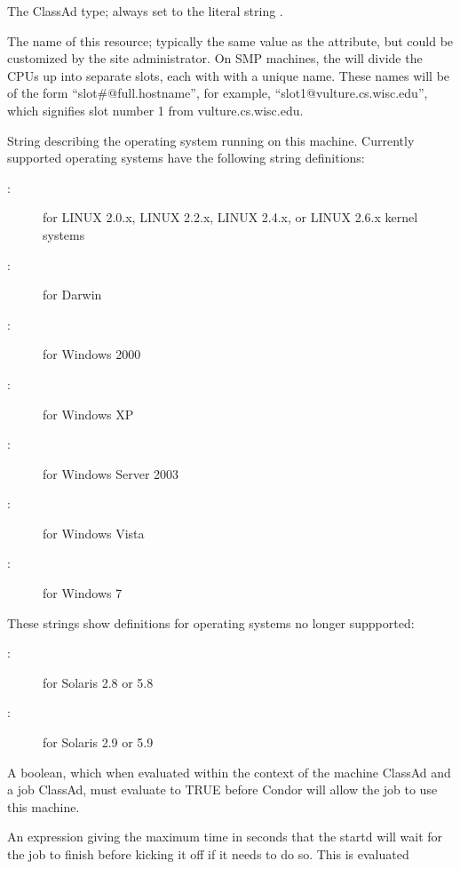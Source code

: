 \begin{description}
\item[\AdAttr{MyType}:] The ClassAd type; always set to the literal string .
%
\item[\AdAttr{Name}:] The name of this resource; typically the same value as
the  attribute, but could be customized by the site
administrator.
On SMP machines, the  will divide the CPUs up into separate
slots, each with with a unique name.
These names will be of the form ``slot\#@full.hostname'', for example,
``slot1@vulture.cs.wisc.edu'', which signifies slot number 1 from
vulture.cs.wisc.edu.
%
\item[\AdAttr{OpSys}:] String describing the operating system running on this
machine.  
Currently supported operating systems have the following string
definitions:
	\begin{description}
	\item[:] for LINUX 2.0.x, LINUX 2.2.x,
	LINUX 2.4.x, or LINUX 2.6.x kernel systems
	\item[:] for Darwin
	\item[:] for Windows 2000
	\item[:] for Windows XP
	\item[:] for Windows Server 2003
	\item[:] for Windows Vista
	\item[:] for Windows 7
	\end{description}
These strings show definitions for operating systems no longer suppported:
	\begin{description}
	\item[:] for Solaris 2.8 or 5.8
	\item[:] for Solaris 2.9 or 5.9
	\end{description}
%
\item[\AdAttr{Requirements}:] A boolean, which when evaluated within the context
of the machine ClassAd and a job ClassAd, must evaluate to
TRUE before Condor will allow the job to use this machine.
%
\item[\AdAttr{MaxJobRetirementTime}:] An expression giving the
maximum time in seconds that the startd will wait for the job to
finish before kicking it off if it needs to do so.  This is evaluated

\end{description}
